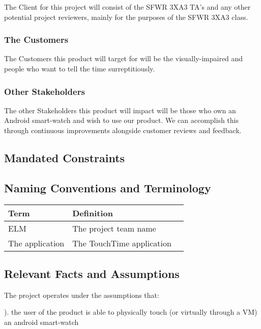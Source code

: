 \documentclass[12pt, titlepage]{article}
\begin{document}
The Client for this project will consist of the SFWR 3XA3 TA's and any other potential project reviewers, mainly for the purposes of the SFWR 3XA3 class.  

\subsubsection{The Customers}

The Customers this product will target for will be the visually-impaired and people who want to tell the time surreptitiously.

\subsubsection{Other Stakeholders}

The other Stakeholders this product will impact will be those who own an Android smart-watch and wish to use our product. We can accomplish this through continuous improvements alongside customer reviews and feedback. 

\subsection{Mandated Constraints}

\subsection{Naming Conventions and Terminology}

\begin{center}
    \begin{tabular}{| l | l | p{5cm} | }
    \hline
    Term & Definition \\ \hline
    ELM & The project team name \\ \hline
    The application & The TouchTime application \\ \hline
    \end{tabular}
\end{center}

\subsection{Relevant Facts and Assumptions}
The project operates under the assumptions that:
\vspace{2mm}

). the user of the product is able to physically touch (or virtually through a VM) an android smart-watch
\end{document}
